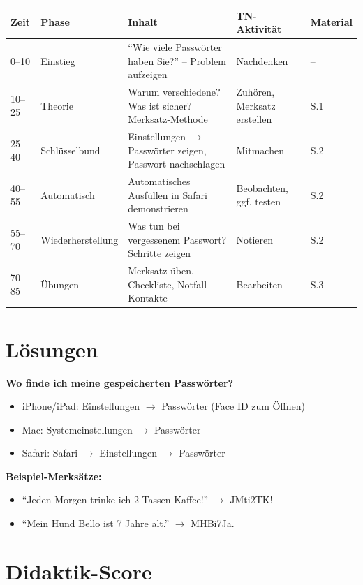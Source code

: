 \documentclass[11pt,a4paper]{article}
\begin{document}
\begin{longtable}{|p{1cm}|p{2cm}|p{5cm}|p{3cm}|p{2cm}|}
\hline
\textbf{Zeit} & \textbf{Phase} & \textbf{Inhalt} & \textbf{TN-Aktivität} & \textbf{Material} \\
\hline
0--10 & Einstieg & ``Wie viele Passwörter haben Sie?'' -- Problem aufzeigen & Nachdenken & -- \\
\hline
10--25 & Theorie & Warum verschiedene? Was ist sicher? Merksatz-Methode & Zuhören, Merksatz erstellen & S.1 \\
\hline
25--40 & Schlüsselbund & Einstellungen $\rightarrow$ Passwörter zeigen, Passwort nachschlagen & Mitmachen & S.2 \\
\hline
40--55 & Automatisch & Automatisches Ausfüllen in Safari demonstrieren & Beobachten, ggf. testen & S.2 \\
\hline
55--70 & Wiederherstellung & Was tun bei vergessenem Passwort? Schritte zeigen & Notieren & S.2 \\
\hline
70--85 & Übungen & Merksatz üben, Checkliste, Notfall-Kontakte & Bearbeiten & S.3 \\
\hline
\end{longtable}

\section{Lösungen}

\textbf{Wo finde ich meine gespeicherten Passwörter?}
\begin{itemize}
    \item iPhone/iPad: Einstellungen $\rightarrow$ Passwörter (Face ID zum Öffnen)
    \item Mac: Systemeinstellungen $\rightarrow$ Passwörter
    \item Safari: Safari $\rightarrow$ Einstellungen $\rightarrow$ Passwörter
\end{itemize}

\textbf{Beispiel-Merksätze:}
\begin{itemize}
    \item ``Jeden Morgen trinke ich 2 Tassen Kaffee!'' $\rightarrow$ JMti2TK!
    \item ``Mein Hund Bello ist 7 Jahre alt.'' $\rightarrow$ MHBi7Ja.
\end{itemize}

\section{Didaktik-Score}
\end{document}
